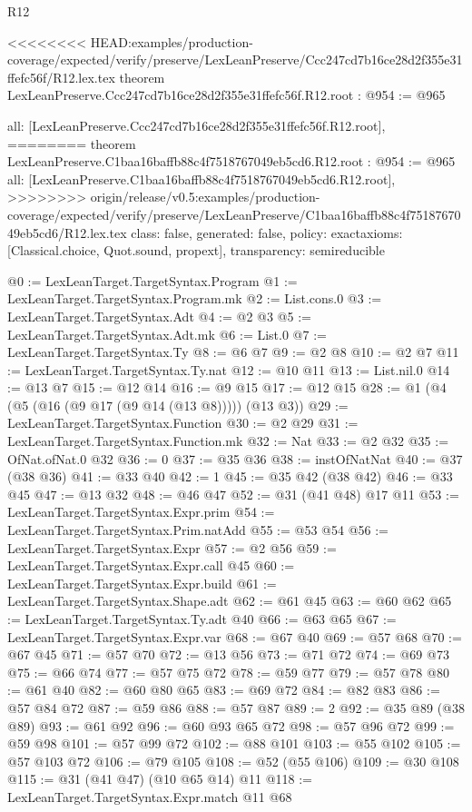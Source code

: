 \begin{lexlean}{R12}
\begin{coremodule}
{{{{{{{{}
<<<<<<<< HEAD:examples/production-coverage/expected/verify/preserve/LexLeanPreserve/Ccc247cd7b16ce28d2f355e31ffefc56f/R12.lex.tex
theorem LexLeanPreserve.Ccc247cd7b16ce28d2f355e31ffefc56f.R12.root : @954 := @965 {
  all: [LexLeanPreserve.Ccc247cd7b16ce28d2f355e31ffefc56f.R12.root],
========
theorem LexLeanPreserve.C1baa16baffb88c4f7518767049eb5cd6.R12.root : @954 := @965 {
  all: [LexLeanPreserve.C1baa16baffb88c4f7518767049eb5cd6.R12.root],
>>>>>>>> origin/release/v0.5:examples/production-coverage/expected/verify/preserve/LexLeanPreserve/C1baa16baffb88c4f7518767049eb5cd6/R12.lex.tex
  class: false,
  generated: false,
  policy: exact{axioms: [Classical.choice, Quot.sound, propext]},
  transparency: semireducible
}

@0 := LexLeanTarget.TargetSyntax.Program
@1 := LexLeanTarget.TargetSyntax.Program.mk
@2 := List.cons.{0}
@3 := LexLeanTarget.TargetSyntax.Adt
@4 := @2 @3
@5 := LexLeanTarget.TargetSyntax.Adt.mk
@6 := List.{0}
@7 := LexLeanTarget.TargetSyntax.Ty
@8 := @6 @7
@9 := @2 @8
@10 := @2 @7
@11 := LexLeanTarget.TargetSyntax.Ty.nat
@12 := @10 @11
@13 := List.nil.{0}
@14 := @13 @7
@15 := @12 @14
@16 := @9 @15
@17 := @12 @15
@28 := @1 (@4 (@5 (@16 (@9 @17 (@9 @14 (@13 @8))))) (@13 @3))
@29 := LexLeanTarget.TargetSyntax.Function
@30 := @2 @29
@31 := LexLeanTarget.TargetSyntax.Function.mk
@32 := Nat
@33 := @2 @32
@35 := OfNat.ofNat.{0} @32
@36 := 0
@37 := @35 @36
@38 := instOfNatNat
@40 := @37 (@38 @36)
@41 := @33 @40
@42 := 1
@45 := @35 @42 (@38 @42)
@46 := @33 @45
@47 := @13 @32
@48 := @46 @47
@52 := @31 (@41 @48) @17 @11
@53 := LexLeanTarget.TargetSyntax.Expr.prim
@54 := LexLeanTarget.TargetSyntax.Prim.natAdd
@55 := @53 @54
@56 := LexLeanTarget.TargetSyntax.Expr
@57 := @2 @56
@59 := LexLeanTarget.TargetSyntax.Expr.call @45
@60 := LexLeanTarget.TargetSyntax.Expr.build
@61 := LexLeanTarget.TargetSyntax.Shape.adt
@62 := @61 @45
@63 := @60 @62
@65 := LexLeanTarget.TargetSyntax.Ty.adt @40
@66 := @63 @65
@67 := LexLeanTarget.TargetSyntax.Expr.var
@68 := @67 @40
@69 := @57 @68
@70 := @67 @45
@71 := @57 @70
@72 := @13 @56
@73 := @71 @72
@74 := @69 @73
@75 := @66 @74
@77 := @57 @75 @72
@78 := @59 @77
@79 := @57 @78
@80 := @61 @40
@82 := @60 @80 @65
@83 := @69 @72
@84 := @82 @83
@86 := @57 @84 @72
@87 := @59 @86
@88 := @57 @87
@89 := 2
@92 := @35 @89 (@38 @89)
@93 := @61 @92
@96 := @60 @93 @65 @72
@98 := @57 @96 @72
@99 := @59 @98
@101 := @57 @99 @72
@102 := @88 @101
@103 := @55 @102
@105 := @57 @103 @72
@106 := @79 @105
@108 := @52 (@55 @106)
@109 := @30 @108
@115 := @31 (@41 @47) (@10 @65 @14) @11
@118 := LexLeanTarget.TargetSyntax.Expr.match @11 @68
}}}}}}}}
\end{coremodule}
\end{lexlean}
